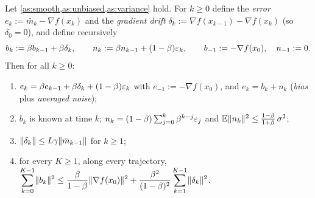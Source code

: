 \begin{lemma}\label{lem:bias-variance}
Let \cref{as:smooth,as:unbiased,as:variance} hold. For $k\ge0$ define the \emph{error}
$e_k:=\bar m_k-\nabla f(x_k)$ and the \emph{gradient drift}
$\delta_k:=\nabla f(x_{k-1})-\nabla f(x_k)$ (so $\delta_0=0$), and define recursively
\[
  b_k:=\beta b_{k-1}+\beta\delta_k,\qquad n_k:=\beta n_{k-1}+(1-\beta)\varepsilon_k,
  \qquad b_{-1}:=-\nabla f(x_0),\quad n_{-1}:=0 .
\]
Then for all $k\ge0$:
\begin{enumerate}[label=\textup{(\alph*)}]
\item $e_k=\beta e_{k-1}+\beta\delta_k+(1-\beta)\varepsilon_k$ with $e_{-1}:=-\nabla f(x_0)$, and
      $e_k=b_k+n_k$ (\emph{bias} plus \emph{averaged noise});
\item $b_k$ is known at time $k$; $n_k=(1-\beta)\sum_{j=0}^k\beta^{k-j}\varepsilon_j$ and
      $\mathbb{E}\lVert n_k\rVert^2\le\frac{1-\beta}{1+\beta}\,\sigma^2$;
\item $\lVert \delta_k\rVert\le L\gamma\lVert \bar m_{k-1}\rVert$ for $k\ge1$;
\item for every $K\ge1$, along every trajectory,
      $\displaystyle\sum_{k=0}^{K-1}\lVert b_k\rVert^2\le\frac{\beta}{1-\beta}\lVert \nabla f(x_0)\rVert^2
      +\frac{\beta^2}{(1-\beta)^2}\sum_{k=1}^{K-1}\lVert \delta_k\rVert^2$.
\end{enumerate}
\end{lemma}

